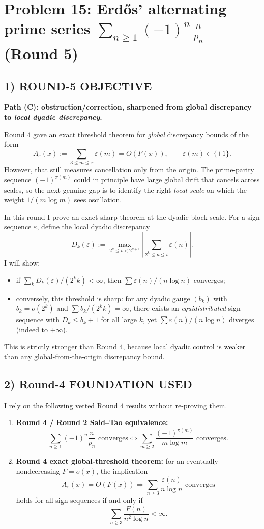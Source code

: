 \section{Problem 15: Erd\H{o}s' alternating prime series $\sum_{n\ge 1} (-1)^n\,\frac{n}{p_n}$ (Round 5)}

\subsection{1) ROUND-5 OBJECTIVE}

\textbf{Path (C): obstruction/correction, sharpened from global discrepancy to \emph{local dyadic discrepancy}.}

Round 4 gave an exact threshold theorem for \emph{global} discrepancy bounds of the form
\[
A_\varepsilon(x):=\sum_{3\le m\le x}\varepsilon(m)=O(F(x)),
\qquad \varepsilon(m)\in\{\pm 1\}.
\]
However, that still measures cancellation only from the origin.  The prime-parity sequence
\( (-1)^{\pi(m)} \) could in principle have large global drift that cancels across scales, so the next genuine gap is to identify the right \emph{local scale} on which the weight \(1/(m\log m)\) sees oscillation.

In this round I prove an exact sharp theorem at the dyadic-block scale.  For a sign sequence \(\varepsilon\), define the local dyadic discrepancy
\[
D_k(\varepsilon):=\max_{2^k\le t<2^{k+1}}\left|\sum_{2^k\le n\le t}\varepsilon(n)\right|.
\]
I will show:
\begin{itemize}
\item if \(\sum_k D_k(\varepsilon)/(2^k k)<\infty\), then \(\sum \varepsilon(n)/(n\log n)\) converges;
\item conversely, this threshold is sharp: for any dyadic gauge \((b_k)\) with \(b_k=o(2^k)\) and \(\sum b_k/(2^k k)=\infty\), there exists an \emph{equidistributed} sign sequence with \(D_k\le b_k+1\) for all large \(k\), yet \(\sum \varepsilon(n)/(n\log n)\) diverges (indeed to \(+\infty\)).
\end{itemize}

This is strictly stronger than Round 4, because local dyadic control is weaker than any global-from-the-origin discrepancy bound.

\subsection{2) Round-4 FOUNDATION USED}

I rely on the following vetted Round 4 results without re-proving them.
\begin{enumerate}
\item \textbf{Round 4 / Round 2 Said--Tao equivalence:}
\[
\sum_{n\ge 1}(-1)^n\frac{n}{p_n}\text{ converges}
\iff
\sum_{m\ge 2}\frac{(-1)^{\pi(m)}}{m\log m}\text{ converges}.
\]
\item \textbf{Round 4 exact global-threshold theorem:} for an eventually nondecreasing \(F=o(x)\), the implication
\[
A_\varepsilon(x)=O(F(x)) \Longrightarrow \sum_{n\ge 3}\frac{\varepsilon(n)}{n\log n}\text{ converges}
\]
holds for all sign sequences if and only if
\[
\sum_{n\ge 3}\frac{F(n)}{n^2\log n}<\infty.
\]
\end{enumerate}

